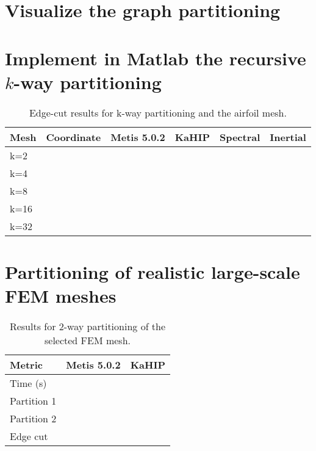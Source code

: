 \documentclass[unicode,11pt,a4paper,oneside,numbers=endperiod,openany]{scrartcl}
\begin{document}
\section{Visualize the graph partitioning }
\section{Implement in Matlab the recursive $k$-way partitioning }
\begin{table}[h]
	\caption{Edge-cut results for k-way partitioning and the airfoil mesh.}
	\centering
	\begin{tabular}{l|r|r|r|r|r} \hline\hline 
		Mesh            &  Coordinate           & Metis 5.0.2 & KaHIP & Spectral & Inertial  \\ \hline
		k=2             &                       &           &           &          &           \\             
		k=4             &                       &           &           &          &           \\ 
		k=8             &                       &           &           &          &           \\ 
		k=16            &                       &           &           &          &           \\ 
		k=32            &                       &           &           &          &           \\ \hline \hline
	\end{tabular}
	\label{table:kway}
\end{table}
\section{Partitioning of realistic large-scale FEM meshes }
\begin{table}[h]
	\caption{Results for 2-way partitioning of the selected FEM mesh.}
	\centering
	\begin{tabular}{l|r|r} \hline\hline 
		Metric            &  Metis 5.0.2      & KaHIP \\ \hline
		Time (s)         &                       &                \\             
		Partition 1         &                       &          \\  
		Partition 2         &                       &         \\  
		Edge cut            &                       &       \\ \hline \hline
	\end{tabular}
	\label{table:FEMkway}
\end{table}
\end{document}

